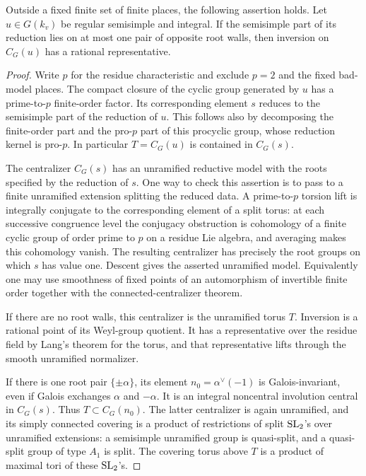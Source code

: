 \begin{lemma}\label{lem:d4-one-wall}
Outside a fixed finite set of finite places, the following assertion
holds.  Let $u\in G(k_v)$ be regular semisimple and integral.  If the
semisimple part of its reduction lies on at most one pair of opposite
root walls, then inversion on $C_G(u)$ has a rational representative.
\end{lemma}

\begin{proof}
Write $p$ for the residue characteristic and exclude $p=2$ and the fixed
bad-model places.  The compact closure of the cyclic group generated by
$u$ has a prime-to-$p$ finite-order factor.  Its corresponding element
$s$ reduces to the semisimple part of the reduction of $u$.  This follows
also by decomposing the finite-order part and the pro-$p$ part of this
procyclic group, whose reduction kernel is pro-$p$.  In particular
$T=C_G(u)$ is contained in $C_G(s)$.

The centralizer $C_G(s)$ has an unramified reductive model with the roots
specified by the reduction of $s$.  One way to check this assertion is to
pass to a finite unramified extension splitting the reduced data.  A
prime-to-$p$ torsion lift is integrally conjugate to the corresponding
element of a split torus: at each successive congruence level the
conjugacy obstruction is cohomology of a finite cyclic group of order
prime to $p$ on a residue Lie algebra, and averaging makes this
cohomology vanish.  The resulting centralizer has precisely the root
groups on which $s$ has value one.  Descent gives the asserted unramified
model.  Equivalently one may use smoothness of fixed points of an
automorphism of invertible finite order together with the
connected-centralizer theorem.

If there are no root walls, this centralizer is the unramified torus
$T$.  Inversion is a rational point of its Weyl-group quotient.  It has a
representative over the residue field by Lang's theorem for the torus,
and that representative lifts through the smooth unramified normalizer.

If there is one root pair $\{\pm\alpha\}$, its element
$n_0=\alpha^\vee(-1)$ is Galois-invariant, even if Galois exchanges
$\alpha$ and $-\alpha$.  It is an integral noncentral involution central
in $C_G(s)$.  Thus $T\subset C_G(n_0)$.  The latter centralizer is again
unramified, and its simply connected covering is a product of
restrictions of split $\operatorname{SL}_2$'s over unramified extensions: a semisimple
unramified group is quasi-split, and a quasi-split group of type $A_1$ is
split.  The covering torus above $T$ is a product of maximal tori of
these $\operatorname{SL}_2$'s.


\end{proof}
